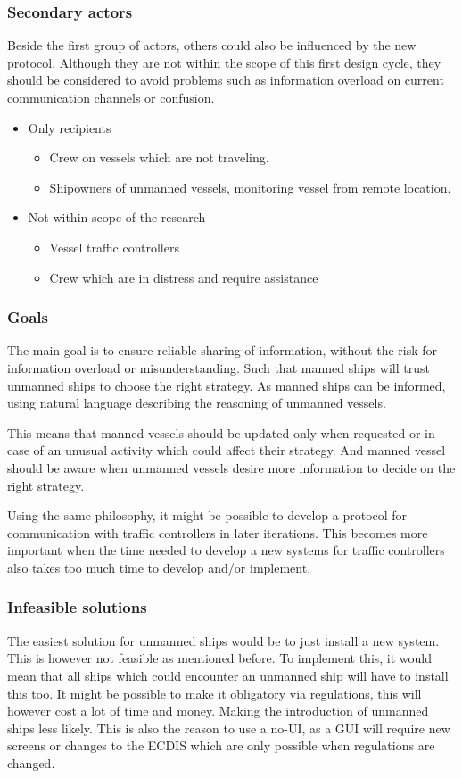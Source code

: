 \subsubsection{Secondary actors}
Beside the first group of actors, others could also be influenced by the new protocol. Although they are not within the scope of this first design cycle, they should be considered to avoid problems such as information overload on current communication channels or confusion. 
\begin{itemize}
	\item Only recipients
	\begin{itemize}
		\item Crew on vessels which are not traveling.
		\item Shipowners of unmanned vessels, monitoring vessel from remote location.
	\end{itemize}
	\item Not within scope of the research
	\begin{itemize}
		\item Vessel traffic controllers
		\item Crew which are in distress and require assistance
	\end{itemize}
\end{itemize}

\subsubsection{Goals}
The main goal is to ensure reliable sharing of information, without the risk for information overload or misunderstanding. Such that manned ships will trust unmanned ships to choose the right strategy. As manned ships can be informed, using natural language describing the reasoning of unmanned vessels.

This means that manned vessels should be updated only when requested or in case of an unusual activity which could affect their strategy. And manned vessel should be aware when unmanned vessels desire more information to decide on the right strategy.

Using the same philosophy, it might be possible to develop a protocol for communication with traffic controllers in later iterations. This becomes more important when the time needed to develop a new systems for traffic controllers also takes too much time to develop and/or implement.

\subsubsection{Infeasible solutions}
The easiest solution for unmanned ships would be to just install a new system. This is however not feasible as mentioned before. To implement this, it would mean that all ships which could encounter an unmanned ship will have to install this too. It might be possible to make it obligatory via regulations, this will however cost a lot of time and money. Making the introduction of unmanned ships less likely.
This is also the reason to use a \ac{no-UI}, as a GUI will require new screens or changes to the \ac{ECDIS} which are only possible when regulations are changed.

